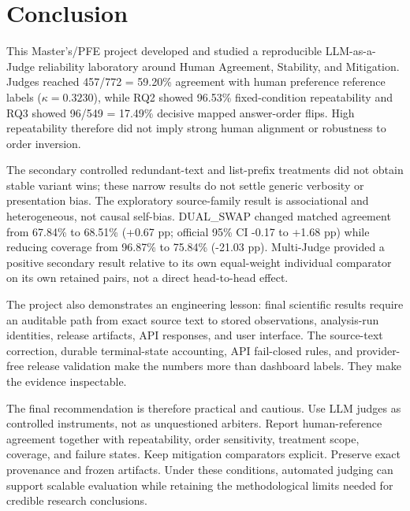 \chapter{Conclusion}

This Master's/PFE project developed and studied a reproducible LLM-as-a-Judge reliability laboratory around Human Agreement, Stability, and Mitigation. Judges reached 457/772 = 59.20\% agreement with human preference reference labels ($\kappa=0.3230$), while RQ2 showed 96.53\% fixed-condition repeatability and RQ3 showed 96/549 = 17.49\% decisive mapped answer-order flips. High repeatability therefore did not imply strong human alignment or robustness to order inversion.

The secondary controlled redundant-text and list-prefix treatments did not obtain stable variant wins; these narrow results do not settle generic verbosity or presentation bias. The exploratory source-family result is associational and heterogeneous, not causal self-bias. DUAL\_SWAP changed matched agreement from 67.84\% to 68.51\% (+0.67 pp; official 95\% CI -0.17 to +1.68 pp) while reducing coverage from 96.87\% to 75.84\% (-21.03 pp). Multi-Judge provided a positive secondary result relative to its own equal-weight individual comparator on its own retained pairs, not a direct head-to-head effect.

The project also demonstrates an engineering lesson: final scientific results require an auditable path from exact source text to stored observations, analysis-run identities, release artifacts, API responses, and user interface. The source-text correction, durable terminal-state accounting, API fail-closed rules, and provider-free release validation make the numbers more than dashboard labels. They make the evidence inspectable.

The final recommendation is therefore practical and cautious. Use LLM judges as controlled instruments, not as unquestioned arbiters. Report human-reference agreement together with repeatability, order sensitivity, treatment scope, coverage, and failure states. Keep mitigation comparators explicit. Preserve exact provenance and frozen artifacts. Under these conditions, automated judging can support scalable evaluation while retaining the methodological limits needed for credible research conclusions.
